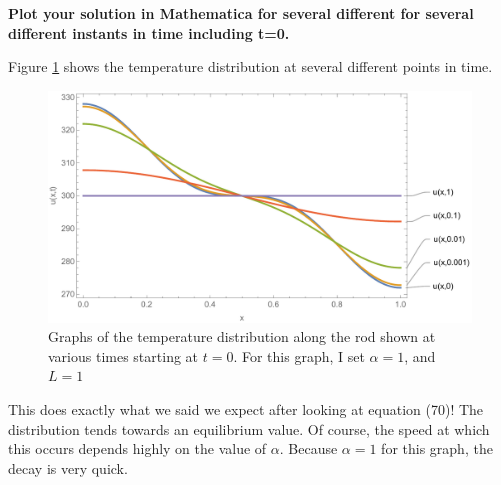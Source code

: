 \documentclass[a4paper, 11pt]{article}
\newenvironment{solution}{%
	\begin{list}{}{%
			\setlength{\topsep}{0pt}%
			\setlength{\leftmargin}{0.5cm}%
			\setlength{\rightmargin}{0.5cm}%
			\setlength{\listparindent}{\parindent}%
			\setlength{\itemindent}{\parindent}%
			\setlength{\parsep}{\parskip}%
		}%
		\item[]}{\end{list}}
\begin{document}
\begin{enumerate}[leftmargin=0em]
      \item \textbf{Plot your solution in Mathematica for several different for
          several different instants in time including t=0. }\\
        \begin{solution}
          Figure \ref{fig:time_evolution} shows the temperature distribution at
          several different points in time. \\ 
          \begin{figure}[!hbt]
            \centering
            \includegraphics[width=1\columnwidth]{time_evolution}
            \caption{Graphs of the temperature distribution along the rod shown
              at various times starting at $t=0$. For this graph, I set
              $\alpha=1$, and $L=1$}
            \label{fig:time_evolution}
          \end{figure}

          This does exactly what we said we expect after looking at equation
          (70)! The distribution tends towards an equilibrium value. Of course,
          the speed at which this occurs depends highly on the value of
          $\alpha$. Because $\alpha=1$ for this graph, the decay is very quick.
        \end{solution}
        
      
\end{enumerate}
\end{document}
